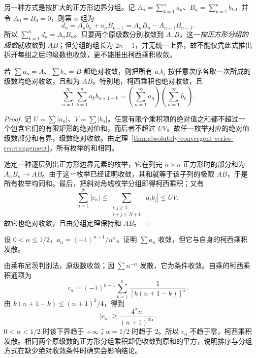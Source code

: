 另一种方式是按扩大的正方形边界分组。记 $A_n=\sum_{k=1}^n a_k$、$B_n=\sum_{k=1}^n b_k$，并令 $A_0=B_0=0$，则第 $n$ 组为
\[
    d_n=A_nb_n+a_nB_{n-1}=A_nB_n-A_{n-1}B_{n-1}.
\]
所以 $\sum_{k=1}^n d_k=A_nB_n$。只要两个原级数分别收敛到 $A,B$，这一\emph{按正方形分组的级数}就收敛到 $AB$；但分组的组长为 $2n-1$，并无统一上界，故不能仅凭此式推出拆开每组之后的级数也收敛，更不能推出柯西乘积收敛。

\begin{theorem}[绝对收敛级数的乘法]
\label{thm:absolutely-convergent-series-product}
若 $\sum a_n=A$、$\sum b_n=B$ 都绝对收敛，则把所有 $a_ib_j$ 按任意次序各取一次所成的级数均绝对收敛，且和为 $AB$。特别地，柯西乘积也绝对收敛，且
\begin{equation}
    \sum_{n=1}^{\infty}\sum_{k=1}^n a_kb_{n+1-k}
      =\left(\sum_{n=1}^{\infty}a_n\right)
       \left(\sum_{n=1}^{\infty}b_n\right).
    \label{eq:absolute-series-cauchy-product}
\end{equation}
\end{theorem}

\begin{proof}
记 $U=\sum|a_n|$、$V=\sum|b_n|$。任意有限个乘积项的绝对值之和都不超过一个包含它们的有限矩形的绝对值和，而后者不超过 $UV$。故任一枚举对应的绝对值级数部分和有界，级数绝对收敛。由定理~\ref{thm:absolutely-convergent-series-rearrangement}，所有枚举的和相同。

选定一种逐层列出正方形边界元素的枚举，它在列完 $n\times n$ 正方形时的部分和为 $A_nB_n\to AB$。由于这一枚举已经证明收敛，其和就等于该子列的极限 $AB$，于是所有枚举均同和。最后，把斜对角线枚举分组即得柯西乘积；又有
\[
    \sum_{n=1}^N|c_n|
    \leq\sum_{\substack{i,j\geq1\\i+j\leq N+1}}|a_i b_j|
    \leq UV,
\]
故它也绝对收敛，且由分组定理保持和 $AB$。
\end{proof}

\begin{example}
\label{ex:conditional-series-cauchy-square-divergence}
设 $0<\alpha\leq1/2$，$a_n=(-1)^{n-1}/n^\alpha$。证明 $\sum a_n$ 收敛，但它与自身的柯西乘积发散。
\end{example}

\begin{solve}
由莱布尼茨判别法，原级数收敛；因 $\sum n^{-\alpha}$ 发散，它为条件收敛。自乘的柯西乘积通项为
\[
    c_n=(-1)^{n-1}\sum_{k=1}^n
        \frac1{[k(n+1-k)]^\alpha}.
\]
由 $k(n+1-k)\leq(n+1)^2/4$，得到
\[
    |c_n|\geq\frac{4^\alpha n}{(n+1)^{2\alpha}}.
\]
$0<\alpha<1/2$ 时该下界趋于 $+\infty$；$\alpha=1/2$ 时趋于 $2$。所以 $c_n$ 不趋于零，柯西乘积发散。相同两个原级数的正方形分组乘积却仍收敛到原和的平方，说明排序与分组方式在缺少绝对收敛条件时确实会影响结论。
\end{solve}

